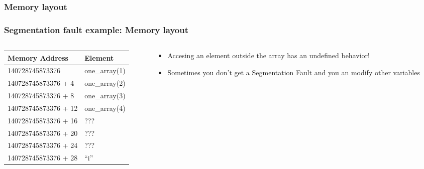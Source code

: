 \documentclass[t]{myBeamer}
\begin{document}
\subsubsection{Memory layout} 
\begin{frame}[t]
\frametitle{ \huge Segmentation fault example: Memory layout}
\begin{columns}
 

\begin{column}{0.65\textwidth}
\begin{table}[]
\centering
\begin{tabular}{|l|l|}
\hline
Memory Address        & Element       \\ \hline
140728745873376      & one\_array(1) \\ \hline
140728745873376 + 4  & one\_array(2) \\ \hline
140728745873376 + 8  & one\_array(3) \\ \hline
140728745873376 + 12 & one\_array(4) \\ \hline
140728745873376 + 16 & ???           \\ \hline
140728745873376 + 20 & ???           \\ \hline
140728745873376 + 24 & ???           \\ \hline
140728745873376 + 28 & “i”           \\ \hline
\end{tabular}
\end{table}
\end{column}
\begin{column}{0.5\textwidth}
  \begin{itemize}
   \item Accesing an element outside the array has an undefined behavior!
   \item Sometimes you don't get a Segmentation Fault and you an modify other variables
  \end{itemize}
\end{column}

\end{columns}
\end{frame} 
\end{document}
